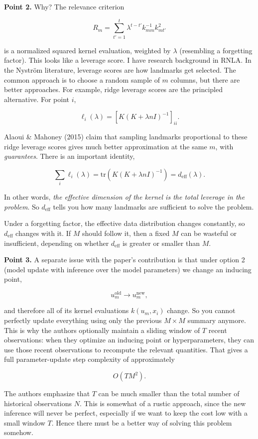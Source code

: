 \documentclass[11pt,a4paper]{article}
\begin{document}
\textbf{Point 2.} Why? The relevance criterion

\[
R_m = \sum_{t'=1}^{t} \lambda^{t-t'} k_{mm}^{-1} k_{mt'}^{2}
\]

is a normalized squared kernel evaluation, weighted by $\lambda$ (resembling a forgetting factor). This looks like a leverage score. I have research background in RNLA. In the Nyström literature, leverage scores are how landmarks get selected. The common approach is to choose a random sample of $m$ columns, but there are better approaches. For example, ridge leverage scores are the principled alternative. For point $i$,

\[
\ell_i(\lambda) = \left[K\left(K + \lambda n I\right)^{-1}\right]_{ii}.
\]

Alaoui \& Mahoney (2015) claim that sampling landmarks proportional to these ridge leverage scores gives much better approximation at the same $m$, with \emph{guarantees}. There is an important identity,

\[
\sum_i \ell_i(\lambda) = \mathrm{tr}\left(K\left(K + \lambda n I\right)^{-1}\right) = d_{\mathrm{eff}}(\lambda).
\]

In other words, \emph{the effective dimension of the kernel is the total leverage in the problem}. So $d_{\mathrm{eff}}$ tells you how many landmarks are sufficient to solve the problem.

Under a forgetting factor, the effective data distribution changes constantly, so $d_{\mathrm{eff}}$ changes with it. If $M$ should follow it, then a fixed $M$ can be wasteful or insufficient, depending on whether $d_{\mathrm{eff}}$ is greater or smaller than $M$.

\textbf{Point 3.} A separate issue with the paper's contribution is that under option 2 (model update with inference over the model parameters) we change an inducing point,

\[
u_m^{\mathrm{old}} \rightarrow u_m^{\mathrm{new}},
\]

and therefore all of its kernel evaluations $k(u_m,x_i)$ change. So you cannot perfectly update everything using only the previous $M\times M$ summary anymore. This is why the authors optionally maintain a sliding window of $T$ recent observations: when they optimize an inducing point or hyperparameters, they can use those recent observations to recompute the relevant quantities. That gives a full parameter-update step complexity of approximately

\[
\boxed{O(TM^2).}
\]

The authors emphasize that $T$ can be much smaller than the total number of historical observations $N$. This is somewhat of a rustic approach, since the new inference will never be perfect, especially if we want to keep the cost low with a small window $T$. Hence there must be a better way of solving this problem somehow.
\end{document}
